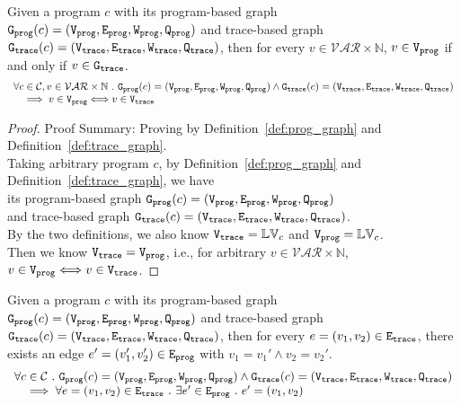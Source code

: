 	\begin{lem}
	\label{lem:vertex_map}
	Given a program $c$ with its
	program-based graph $\mathtt{{G_{prog}}}({c}) = (\mathtt{{V_{prog}}}, \mathtt{{E_{prog}}}, \mathtt{{W_{prog}}}, \mathtt{{Q_{prog}}})$
	and 
	trace-based graph $\mathtt{{G_{trace}}}({c}) = (\mathtt{{V_{trace}}}, \mathtt{{E_{trace}}}, \mathtt{{W_{trace}}}, \mathtt{{Q_{trace}}})$,
	then for every $v \in \mathcal{VAR} \times \mathbb{N}$,
	$v \in \mathtt{{V_{prog}}}$ if and only if $v \in \mathtt{{G_{trace}}}$.
	\[
	\begin{array}{l}
	\forall c \in \mathcal{C} , v \in \mathcal{VAR} \times \mathbb{N} ~.~ 
	\mathtt{{G_{prog}}}({c}) = (\mathtt{{V_{prog}}}, \mathtt{{E_{prog}}}, \mathtt{{W_{prog}}}, \mathtt{{Q_{prog}}})
	\land 
	\mathtt{{G_{trace}}}({c}) = (\mathtt{{V_{trace}}}, \mathtt{{E_{trace}}}, \mathtt{{W_{trace}}}, \mathtt{{Q_{trace}}})
	\\ \quad
	\implies
	v \in \mathtt{{V_{prog}}} \Longleftrightarrow v \in \mathtt{{V_{trace}}}
	\end{array}
	\]
	\end{lem}
\begin{proof}
Proof Summary: Proving by Definition~\ref{def:prog_graph} and Definition~\ref{def:trace_graph}.
\\
Taking arbitrary program $c$,
by Definition~\ref{def:prog_graph} and Definition~\ref{def:trace_graph}, 
we have   
\\
its program-based graph $\mathtt{{G_{prog}}}({c}) = (\mathtt{{V_{prog}}}, \mathtt{{E_{prog}}}, \mathtt{{W_{prog}}}, \mathtt{{Q_{prog}}})$ 
\\
and 
trace-based graph $\mathtt{{G_{trace}}}({c}) = (\mathtt{{V_{trace}}}, \mathtt{{E_{trace}}}, \mathtt{{W_{trace}}}, \mathtt{{Q_{trace}}})$.
\\
By the two definitions, we also know 
$\mathtt{{V_{trace}}}  = \mathbb{LV}_c$ and $\mathtt{{V_{prog}}} = \mathbb{LV}_c$.
\\
Then we know $\mathtt{{V_{trace}}}  = \mathtt{{V_{prog}}}$, i.e., 
for arbitrary $v \in \mathcal{VAR} \times \mathbb{N}$, $v \in \mathtt{{V_{prog}}} \Longleftrightarrow v \in \mathtt{{V_{trace}}}$.
\end{proof}
%
	\begin{lem}
	\label{lem:edge_map}
	Given a program $c$ with its
	program-based graph $\mathtt{{G_{prog}}}({c}) = (\mathtt{{V_{prog}}}, \mathtt{{E_{prog}}}, \mathtt{{W_{prog}}}, \mathtt{{Q_{prog}}})$
	and 
	trace-based graph $\mathtt{{G_{trace}}}({c}) = (\mathtt{{V_{trace}}}, \mathtt{{E_{trace}}}, \mathtt{{W_{trace}}}, \mathtt{{Q_{trace}}})$,
	then for every $e = (v_1, v_2) \in \mathtt{{E_{trace}}}$, there exists an edge 
	$e' = (v_1', v_2') \in \mathtt{{E_{prog}}}$ with 
	$v_1 = v_1' \land v_2 = v_2'$.
	\[
	\begin{array}{l}
	\forall c \in \mathcal{C} ~.~
	 \mathtt{{G_{prog}}}({c}) = (\mathtt{{V_{prog}}}, \mathtt{{E_{prog}}}, \mathtt{{W_{prog}}}, \mathtt{{Q_{prog}}})
	\land 
	\mathtt{{G_{trace}}}({c}) = (\mathtt{{V_{trace}}}, \mathtt{{E_{trace}}}, \mathtt{{W_{trace}}}, \mathtt{{Q_{trace}}})
	\\ \quad
	\implies
	\forall e = (v_1, v_2) \in \mathtt{{E_{trace}}}
	~.~ 
	\exists e' \in \mathtt{{E_{prog}}} ~.~ e' = (v_1, v_2)
	\end{array}
	\]
	\end{lem}
